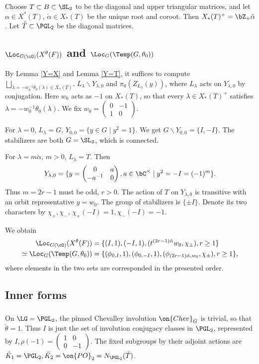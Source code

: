 \documentclass[12pt]{amsart}
\theoremstyle{remark}
\begin{document}
Choose $T\subset B\subset\SL_2$ to be the diagonal and upper triangular matrices,
and let $\alpha\in X^*(T)$, $\check\alpha\in X_*(T)$
be the unique root and coroot.
Then $X_*(T)^+=\bZ_{+}\check\alpha$.
Let $\check T\subset\PGL_2$ be the diagonal matrices.

\subsection{$\Loc_{G(\cO)}(X^\theta(F))$ and $\Loc_G(\Temp(G,\theta_0))$}
By Lemma \ref{Y=X} and Lemma \ref{Y=T},
it suffices to compute
$\bigsqcup_{\lambda=-w_0^{-1}\theta_0(\lambda)\in X_*(T)^+} L_\lambda\backslash Y_{\lambda,0}$
and $\pi_0(Z_{L_\lambda}(y))$,
where $L_\lambda$ acts on $Y_{\lambda,0}$ by conjugation.
Here $w_0$ acts as $-1$ on $X_*(T)$,
so that every $\lambda\in X_*(T)^+$ satisfies 
$\lambda=-w_0^{-1}\theta_0(\lambda)$.
We fix $w_0=\begin{pmatrix}
    0&-1\\
    1&0
\end{pmatrix}$.

For $\lambda=0$, $L_\lambda=G$,
$Y_{0,0}=\{y\in G\mid y^2=1\}$.
We get $G\backslash Y_{0,0}=\{I,-I\}$.
The stabilizers are both $G=\SL_2$, which is connected.


For $\lambda=m\check\alpha$, $m>0$, $L_\lambda=T$.
Then
\[
Y_{\lambda,0}=\{y=\begin{pmatrix}
    0&a\\
    -a^{-1}&0
\end{pmatrix},a\in\bC^\times\mid y^2=-I=(-1)^m\}.
\]
Thus $m=2r-1$ must be odd, $r>0$. 
The action of $T$ on $Y_{\lambda,0}$ is transitive
with an orbit representative $y=w_0$.
The group of stabilizers is $\{\pm I\}$.
Denote its two characters by $\chi_+,\chi_-$,
$\chi_+(-I)=1,\chi_-(-I)=-1$.


We obtain
\begin{align*}
    \Loc_{G(\cO)}(X^\theta(F))&=\{(I,1),(-I,1),(t^{(2r-1)\check\alpha}w_0,\chi_\pm),r\geq 1\}\\
    \simeq\Loc_G(\Temp(G,\theta_0))&=
    \{(\phi_{0,I},1),(\phi_{0,-I},1),
    (\phi_{(2r-1)\check\alpha,w_0},\chi_\pm),r\geq 1\},
\end{align*}
where elements in the two sets are corresponded in the presented order.

\subsection{Inner forms}
\subsubsection{}
On $\LG=\PGL_2$, the pinned Chevalley involution 
$\on{Chev}_{\check G}$ is trivial,
so that $\check\theta=1$.
Thus $I$ is just the set of involution conjugacy classes in $\PGL_2$, represented by 
$I,\rho(-1)=\begin{pmatrix}
    1&0\\
    0&-1
\end{pmatrix}$.
The fixed subgroups by their adjoint actions are
$\check K_1=\PGL_2,\check K_2=\on{PO}_2=N_{\PGL_2}(\check T)$.
\end{document}
